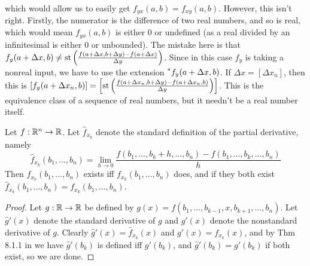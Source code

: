 which would allow us to easily get $f_{yx}(a, b)= f_{xy}(a, b)$. However, this isn't right. Firstly, the numerator is the difference of two real numbers, and so is real, which would mean $f_{yx}(a, b)$ is either $0$ or undefined (as a real divided by an infinitesimal is either $0$ or unbounded). The mistake here is that $f_y(a + \Delta x, b) \neq \operatorname{st}\left(\frac{f(a + \Delta x, b + \Delta y) - f(a + \Delta x)}{\Delta y}\right)$. Since in this case $f_y$ is taking a nonreal input, we have to use the extension $\prescript{*}{}{f_y}(a + \Delta x, b)$. If $\Delta x = [\Delta x_n]$, then this is $[f_y(a + \Delta x_n, b)] = \left[\operatorname{st}\left(\frac{f(a + \Delta x_n, b + \Delta y) - f(a + \Delta x_n, b)}{\Delta y}\right)\right]$. This is the equivalence class of a sequence of real numbers, but it needn't be a real number itself.

\begin{thm}
    Let $f: \mathbb{R}^n \to \mathbb{R}$. Let $\hat{f}_{x_k}$ denote the standard definition of the partial derivative, namely
    \[ \hat{f}_{x_k}(b_1, \ldots, b_n) = \lim_{h \to 0} \frac{f(b_1, \ldots, b_k + h, \ldots, b_n) - f(b_1, \ldots, b_k, \ldots, b_n)}{h} \]
    Then $\hat{f}_{x_k}(b_1, \ldots, b_n)$ exists iff $f_{x_k}(b_1, \ldots, b_n)$ does, and if they both exist $\hat{f}_{x_k}(b_1, \ldots, b_n) = f_{x_k}(b_1, \ldots, b_n)$.
\end{thm}

\begin{proof}
    Let $g: \mathbb{R} \to \mathbb{R}$ be defined by $g(x) = f(b_1, \ldots, b_{k-1}, x, b_{k+1}, \ldots, b_n)$. Let $\hat{g}'(x)$ denote the standard derivative of $g$ and $g'(x)$ denote the nonstandard derivative of $g$. Clearly $\hat{g}'(x) = \hat{f}_{x_k}(x)$ and $g'(x) = f_{x_k}(x)$, and by Thm 8.1.1 in \cite{goldblatt1998} we have $\hat{g}'(b_k)$ is defined iff $g'(b_k)$, and $\hat{g}'(b_k) = g'(b_k)$ if both exist, so we are done.
\end{proof}

